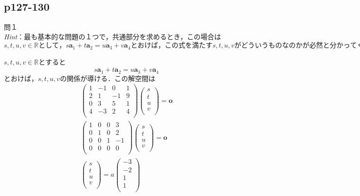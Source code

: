 \documentclass[dvipdfmx,uplatex,11pt]{jsarticle}
\theoremstyle{definition}
\begin{document}
\subsection{p127-130}
\noindent
問１
\noindent \\
\textsl{Hint}：最も基本的な問題の１つで，共通部分を求めるとき，この場合は$s,t,u,v \in \mathbb{R}として，s\bm{a}_1+t\bm{a}_2=u\bm{a}_3+v\bm{a}_4 とおけば，この式を満たすs,t,u,vがどういうものなのかが必然と分かってくる．なお，問題にされていないが和空間の基底を求める場合は，\bm{a}_1,\bm{a}_2,\bm{a}_3,\bm{a}_4から線型独立になるようなベクトルの組を求めればいい．$\\
\dotfill \\
$s,t,u,v \in \mathbb{R}とすると$
\begin{eqnarray*}
s\bm{a}_1+t\bm{a}_2=u\bm{a}_3+v\bm{a}_4
\end{eqnarray*}
$とおけば，s,t,u,vの関係が導ける．この解空間は$
\begin{eqnarray*}
\begin{pmatrix}
1 & -1 & 0 & 1 \\
2 & 1 & -1 & 9 \\
0 & 3 & 5 & 1 \\
4 & -3 & 2 & 4 \\
\end{pmatrix}
\begin{pmatrix}
s \\
t \\
u \\
v \\
\end{pmatrix}
=\bm{o} \\
\begin{pmatrix}
1 & 0 & 0 & 3 \\
0 & 1 & 0 & 2 \\
0 & 0 & 1 & -1 \\
0 & 0 & 0 & 0 \\
\end{pmatrix}
\begin{pmatrix}
s \\
t \\
u \\
v \\
\end{pmatrix}
=\bm{o} \\
\begin{pmatrix}
s \\
t \\
u \\
v \\
\end{pmatrix}
=a
\begin{pmatrix}
-3 \\
-2 \\
1 \\
1 \\
\end{pmatrix}
\end{eqnarray*}
\end{document}
